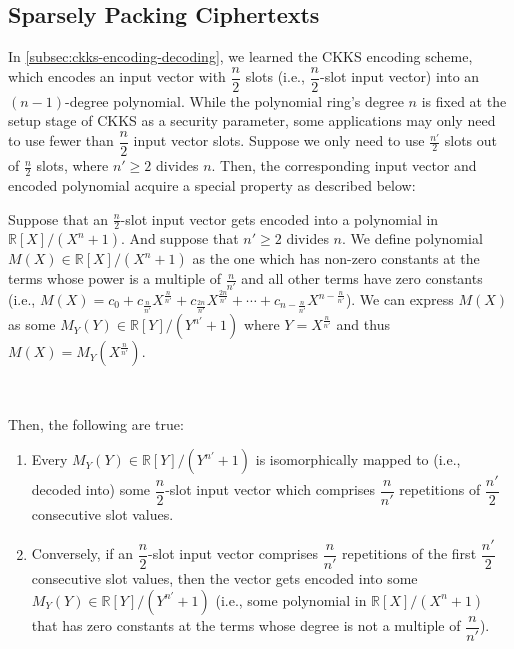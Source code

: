 \subsection{Sparsely Packing Ciphertexts}
\label{subsec:ckks-sparse-packing}

In \autoref{subsec:ckks-encoding-decoding}, we learned the CKKS encoding scheme, which encodes an input vector with $\dfrac{n}{2}$ slots (i.e., $\dfrac{n}{2}$-slot input vector) into an $(n-1)$-degree polynomial. While the polynomial ring's degree $n$ is fixed at the setup stage of CKKS as a security parameter, some applications may only need to use fewer than $\dfrac{n}{2}$ input vector slots. Suppose we only need to use $\frac{n'}{2}$ slots out of $\frac{n}{2}$ slots, where $n'\geq2$ divides $n$. Then, the corresponding input vector and encoded polynomial acquire a special property as described below:


\begin{tcolorbox}[title={\textbf{\tboxlabel{\ref*{subsec:ckks-sparse-packing}} CKKS's Sparsely Packing Polynomial and Ciphertext}}]

Suppose that an $\frac{n}{2}$-slot input vector gets encoded into a polynomial in $\mathbb{R}[X] / (X^n + 1)$. And suppose that $n'\geq2$ divides $n$. We define polynomial $M(X) \in \mathbb{R}[X] / (X^n + 1)$ as the one which has non-zero constants at the terms whose power is a multiple of $\frac{n}{n'}$ and all other terms have zero constants (i.e., $M(X) = c_0 + c_{\frac{n}{n'}}X^{\frac{n}{n'}} + c_{\frac{2n}{n'}}X^{\frac{2n}{n'}} + \cdots + c_{n - \frac{n}{n'}}X^{n - \frac{n}{n'}}$). We can express $M(X)$ as some $M_Y(Y) \in \mathbb{R}[Y] / (Y^{n'} + 1)$ where $Y = X^{\frac{n}{n'}}$ and thus $M(X) = M_Y(X^{\frac{n}{n'}})$.

$ $

Then, the following are true:

\begin{enumerate}
    \item Every $M_Y(Y) \in \mathbb{R}[Y]/(Y^{n'} + 1)$ is isomorphically mapped to (i.e., decoded into) some $\dfrac{n}{2}$-slot input vector which comprises $\dfrac{n}{n'}$ repetitions of $\dfrac{n'}{2}$ consecutive slot values.
    \item Conversely, if an $\dfrac{n}{2}$-slot input vector comprises $\dfrac{n}{n'}$ repetitions of the first $\dfrac{n'}{2}$ consecutive slot values, then the vector gets encoded into some $M_Y(Y) \in \mathbb{R}[Y] / (Y^{n'} + 1)$ (i.e., some polynomial in $\mathbb{R}[X] / (X^n + 1)$ that has zero constants at the terms whose degree is not a multiple of $\dfrac{n}{n'}$).
\end{enumerate}

\end{tcolorbox}


